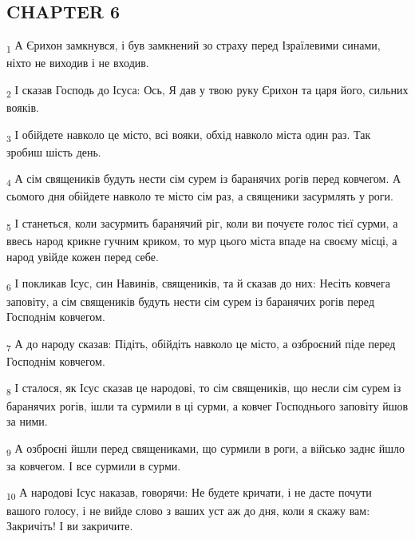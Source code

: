 \subsection{CHAPTER 6}
\begin{tcolorbox}
\textsubscript{1} А Єрихон замкнувся, і був замкнений зо страху перед Ізраїлевими синами, ніхто не виходив і не входив.
\end{tcolorbox}
\begin{tcolorbox}
\textsubscript{2} І сказав Господь до Ісуса: Ось, Я дав у твою руку Єрихон та царя його, сильних вояків.
\end{tcolorbox}
\begin{tcolorbox}
\textsubscript{3} І обійдете навколо це місто, всі вояки, обхід навколо міста один раз. Так зробиш шість день.
\end{tcolorbox}
\begin{tcolorbox}
\textsubscript{4} А сім священиків будуть нести сім сурем із баранячих рогів перед ковчегом. А сьомого дня обійдете навколо те місто сім раз, а священики засурмлять у роги.
\end{tcolorbox}
\begin{tcolorbox}
\textsubscript{5} І станеться, коли засурмить баранячий ріг, коли ви почуєте голос тієї сурми, а ввесь народ крикне гучним криком, то мур цього міста впаде на своєму місці, а народ увійде кожен перед себе.
\end{tcolorbox}
\begin{tcolorbox}
\textsubscript{6} І покликав Ісус, син Навинів, священиків, та й сказав до них: Несіть ковчега заповіту, а сім священиків будуть нести сім сурем із баранячих рогів перед Господнім ковчегом.
\end{tcolorbox}
\begin{tcolorbox}
\textsubscript{7} А до народу сказав: Підіть, обійдіть навколо це місто, а озброєний піде перед Господнім ковчегом.
\end{tcolorbox}
\begin{tcolorbox}
\textsubscript{8} І сталося, як Ісус сказав це народові, то сім священиків, що несли сім сурем із баранячих рогів, ішли та сурмили в ці сурми, а ковчег Господнього заповіту йшов за ними.
\end{tcolorbox}
\begin{tcolorbox}
\textsubscript{9} А озброєні йшли перед священиками, що сурмили в роги, а військо заднє йшло за ковчегом. І все сурмили в сурми.
\end{tcolorbox}
\begin{tcolorbox}
\textsubscript{10} А народові Ісус наказав, говорячи: Не будете кричати, і не дасте почути вашого голосу, і не вийде слово з ваших уст аж до дня, коли я скажу вам: Закричіть! І ви закричите.
\end{tcolorbox}

